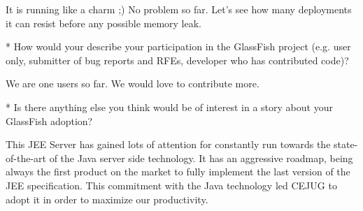\documentclass[10pt,a4paper]{report}
\begin{document}
It is running like a charm ;) No problem so far. Let's see how many deployments it can resist before any possible memory leak.  

* How would your describe your participation in the GlassFish project (e.g.
  user only, submitter of bug reports and RFEs, developer who has contributed
  code)?
  
  We are one users so far. We would love to contribute more.

* Is there anything else you think would be of interest in a story about your
  GlassFish adoption? 
  
This JEE Server has gained lots of attention for constantly run towards the state-of-the-art of the Java server side technology. It has an aggressive roadmap, being always the first product on the market to fully implement the last version of the JEE specification. This commitment with the Java technology led CEJUG to adopt it in order to maximize our productivity.
  
\end{document}
